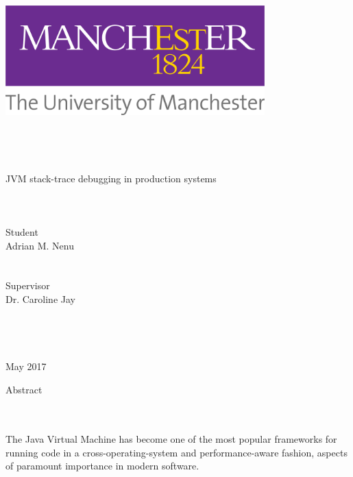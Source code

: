 \documentclass[12pt]{article}
\begin{document}
\begin{center}
    ~\\ 
    ~\\ 

    \includegraphics[width=10cm]{logom.png} 
    ~\\ 
    ~\\ 

    ~\\ 
    ~\\ 
    ~\\ 
    \Huge JVM stack-trace debugging in production systems \\
    ~\\ 
    ~\\ 
        ~\\ 

    \large Student\\ 
    \Large Adrian M. Nenu\\  
    ~\\    
    ~\\ 

    \large Supervisor\\  
    \Large Dr. Caroline Jay
    ~\\ 
    ~\\    
    ~\\ 
    ~\\ 
    ~\\ 

    \large May 2017
\end{center}

\thispagestyle{empty}

\newpage

\begin{center} {\LARGE Abstract} \end{center}

~\\
~\\


The Java Virtual Machine has become one of the most popular frameworks for running code in a cross-operating-system and performance-aware fashion, aspects of paramount importance in modern software.
\end{document}
